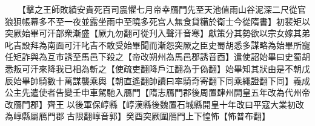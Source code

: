 　　【擊之王師敗績安貴死百司震懼七月帝幸鴈門先至天池值雨山谷泥深二尺從官狼狽帳幕多不至一夜並露坐雨中至曉多死宫人無食貸糒於衛士今從隋書】初裴矩以突厥始畢可汗部衆漸盛【厥九勿翻可從刋入聲汗音寒】獻策分其勢欲以宗女嫁其弟叱吉設拜為南面可汗叱吉不敢受始畢聞而漸怨突厥之臣史蜀胡悉多謀略為始畢所寵任矩詐與為互市誘至馬邑下殺之【帝改朔州為馬邑郡誘音酉】遣使詔始畢曰史蜀胡悉叛可汗來降我已相為斬之【使疏吏翻降戶江翻為于偽翻】始畢知其狀由是不朝戊辰始畢帥騎數十萬謀襲乘輿【朝直遙翻帥讀曰率騎奇寄翻下同乘繩證翻下同】義成公主先遣使者告變壬申車駕馳入鴈門【隋志鴈門郡後周置肆州開皇五年改為代州帝改鴈門郡】齊王以後軍保崞縣【崞漢縣後魏置石城縣開皇十年改曰平寇大業初改為崞縣屬鴈門郡古限翻崞音郭】癸酉突厥圍鴈門上下惶怖【怖普布翻】
